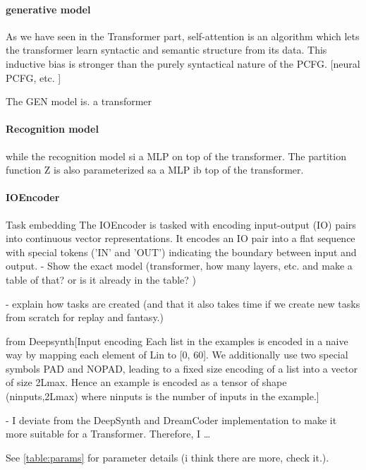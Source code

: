\paragraph{generative model}
As we have seen in the Transformer part, self-attention is an algorithm which lets the transformer learn syntactic and semantic structure from its data. This inductive bias is stronger than the purely syntactical nature of the PCFG.
[neural PCFG, etc. ]

The GEN model is. a transformer


\paragraph{Recognition model}
while the recognition model si a MLP on top of the transformer. The partition function Z is also parameterized sa a MLP ib top of the transformer. 


\paragraph{IOEncoder}
Task embedding 
The IOEncoder is tasked with encoding input-output (IO) pairs into continuous vector representations.
It encodes an IO pair into a flat sequence with special tokens ('IN' and 'OUT') indicating the boundary between input and output.
- Show the exact model (transformer, how many layers, etc. and make a table of that? or is it already in the table? )

- explain how tasks are created (and that it also takes time if we create new tasks from scratch for replay and fantasy.)

from Deepsynth[Input encoding Each list in the examples is encoded in a naive way by mapping each element of Lin to [0, 60]. We additionally use two special symbols PAD and NOPAD, leading to a fixed size encoding of a list into a vector of size 2Lmax. Hence an example is encoded as a tensor of shape (ninputs,2Lmax) where ninputs is the number of inputs in the example.]

- I deviate from the DeepSynth and DreamCoder implementation to make it more suitable for a Transformer.
Therefore, I \dots


See \ref{table:params} for parameter details (i think there are more, check it.). 



